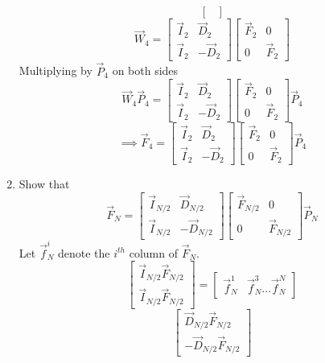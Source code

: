\documentclass[journal,12pt,twocolumn]{IEEEtran}
\renewcommand\thesection{\arabic{section}}
\begin{document}
\begin{enumerate}[label=\thesection.\arabic*]
\[\begin{bmatrix}
\end{bmatrix}
\]
\[
\vec{W}_4 =
\begin{bmatrix}
	\vec{I}_{2} & \vec{D}_{2} \\
\vec{I}_{2} & -\vec{D}_{2}
\end{bmatrix}
\begin{bmatrix}
\vec{F}_{2} & 0 \\
0 & \vec{F}_{2}
\end{bmatrix}
\]
Multiplying by $\vec{P}_4$ on both sides
\[
\vec{W}_4\vec{P}_4 =
\begin{bmatrix}
	\vec{I}_{2} & \vec{D}_{2} \\
\vec{I}_{2} & -\vec{D}_{2}
\end{bmatrix}
\begin{bmatrix}
\vec{F}_{2} & 0 \\
0 & \vec{F}_{2}
\end{bmatrix}
\vec{P}_4
\]
\[\implies
\vec{F}_4 =
\begin{bmatrix}
	\vec{I}_{2} & \vec{D}_{2} \\
\vec{I}_{2} & -\vec{D}_{2}
\end{bmatrix}
\begin{bmatrix}
\vec{F}_{2} & 0 \\
0 & \vec{F}_{2}
\end{bmatrix}
\vec{P}_4
\]
\item Show that 
\begin{equation}
\vec{F}_{N}=
\begin{bmatrix}
\vec{I}_{N/2} & \vec{D}_{N/2} \\
\vec{I}_{N/2} & -\vec{D}_{N/2}
\end{bmatrix}
\begin{bmatrix}
\vec{F}_{N/2} & 0 \\
0 & \vec{F}_{N/2}
\end{bmatrix}
\vec{P}_{N}
\end{equation}
\solution
Let $\vec{f}^i_N$ denote the $i^{th}$ column of $\vec{F}_N$.
\[
\begin{bmatrix}
    \vec{I}_{N/2}\vec{F}_{N/2} \\
    \vec{I}_{N/2}\vec{F}_{N/2}
\end{bmatrix}
=
\begin{bmatrix}
    \vec{f}^1_N & \vec{f}^3_N \ldots \vec{f}^N_N
\end{bmatrix}
\]
\[
\begin{bmatrix}
    \vec{D}_{N/2}\vec{F}_{N/2} \\
    -\vec{D}_{N/2}\vec{F}_{N/2}
\end{bmatrix}
\]
\end{enumerate}
\end{document}
